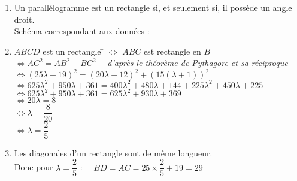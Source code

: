 \documentclass[a4paper,11pt,exos]{nsi} %
\begin{document}
\maketitle

\begin{enumerate}
    \item 	Un parallélogramme est un rectangle si, et seulement si, il possède un angle droit.\\
    Schéma correspondant aux données :
    \begin{center}
    \end{center}
    \item 	 \begin{tabbing}
        $ABCD$ est un rectangle	\= $\Leftrightarrow$ $ABC$ est rectangle en $B$\\
        \>	$\Leftrightarrow AC^2=AB^2+BC^2 \quad$ \textit{d'après le théorème de Pythagore et sa réciproque}\\
        \> $\Leftrightarrow (25\lambda+19)^2=(20\lambda+12)^2+\left(15(\lambda+1)\right)^2$\\
        \> $\Leftrightarrow 625\lambda^2+950\lambda+361=400\lambda^2+480\lambda+144+225\lambda^2+450\lambda+225$\\
        \> $\Leftrightarrow 625\lambda^2+950\lambda+361=625\lambda^2+930\lambda+369$\\
        \> $\Leftrightarrow 20\lambda=8$\\
        \> $\Leftrightarrow \lambda=\dfrac{8}{20}$\\[0.5em]
        \> $\Leftrightarrow \lambda =\dfrac{2}{5}$
    \end{tabbing}	
    \item	Les diagonales d'un rectangle sont de même longueur.\\
    Donc pour $\lambda=\dfrac{2}{5}$ : $\quad BD= AC = 25\times \dfrac{2}{5}+19=29$
\end{enumerate}
\end{document}
